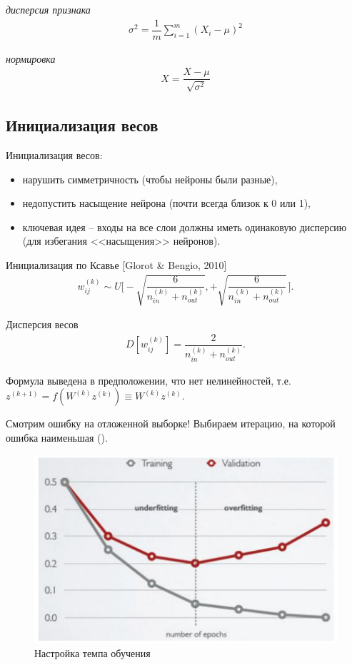 \documentclass[%
	11pt,
	a4paper,
	utf8,
		]{article}
\begin{document}
\emph{дисперсия признака}
\begin{align*}
	\sigma^2 = \dfrac{1}{m} \sum_{i=1}^m (X_i - \mu)^2
\end{align*}

\emph{нормировка}
\begin{align*}
	X = \dfrac{X - \mu}{\sqrt{\sigma^2}}
\end{align*}

\subsection{Инициализация весов}

Инициализация весов:
\begin{itemize}
	\item нарушить симметричность (чтобы нейроны были разные),
	
	\item недопустить насыщение нейрона (почти всегда близок к 0 или 1),
	
	\item ключевая идея -- входы на все слои должны иметь одинаковую дисперсию (для избегания <<насыщения>> нейронов).
\end{itemize}

Инициализация по Ксавье [Glorot \& Bengio, 2010]
\begin{align*}
	w_{ij}^{(k)} \sim U \Bigg[ - \sqrt{ \dfrac{ 6 }{ n_{in}^{(k)} + n_{out}^{(k)}} }, + \sqrt{ \dfrac{ 6 }{ n_{in}^{(k)} + n_{out}^{(k)}} } \, \Bigg].
\end{align*}

Дисперсия весов
\begin{align*}
	D[ w_{ij}^{(k)} ] = \dfrac{ 2 }{ n_{in}^{(k)} + n_{out}^{(k)} }.
\end{align*}

Формула выведена в предположении, что нет нелинейностей, т.е. $ z^{(k+1)} = f(W^{(k)} z^{(k)}) \equiv W^{(k)} z^{(k)} $.

Смотрим ошибку на отложенной выборке! Выбираем итерацию, на которой ошибка наименьшая ().

\begin{figure}[h]
	\centering
	\includegraphics[scale=0.5]{figures/lear_rate.png}
	\caption{ Настройка темпа обучения }\label{fig:lear_rate}
\end{figure}
\end{document}
